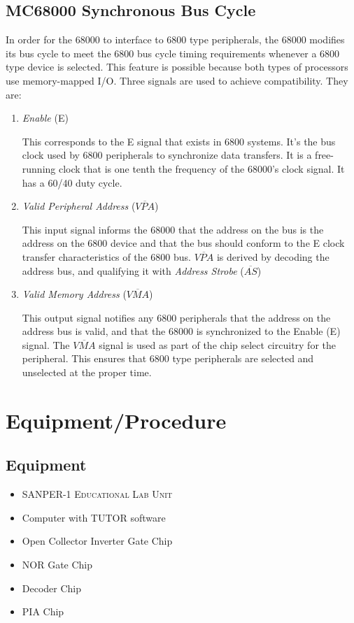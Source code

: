 \documentclass[12pt,Letter]{article}
\begin{document}
\subsection{MC68000 Synchronous Bus Cycle}
In order for the 68000 to interface to 6800 type peripherals, the 68000 modifies its bus cycle to meet the 6800 bus cycle timing requirements whenever a 6800 type device is selected. This feature is possible because both types of processors use memory-mapped I/O. Three signals are used to achieve compatibility. They are:
\begin{enumerate}
	\item \textit{Enable} (E)
	
	\vspace{.2cm}
	This corresponds to the E signal that exists in 6800 systems. It's the bus clock used by 6800 peripherals to synchronize data transfers. It is a free-running clock that is one tenth the frequency of the 68000's clock signal. It has a 60/40 duty cycle.
	
	\item \textit{Valid Peripheral Address} ($\overline{VPA}$)
	
	\vspace{.2cm}
	This input signal informs the 68000 that the address on the bus is the address on the 6800 device and that the bus should conform to the E clock transfer characteristics of the 6800 bus. $\overline{VPA}$ is derived by decoding the address bus, and qualifying it with \textit{Address Strobe} ($\overline{AS}$)
	
	\item \textit{Valid Memory Address} ($\overline{VMA}$)
	
	\vspace{.2cm}
	This output signal notifies any 6800 peripherals that the address on the address bus is valid, and that the 68000 is synchronized to the Enable (E) signal. The $\overline{VMA}$ signal is used as part of the chip select circuitry for the peripheral. This ensures that 6800 type peripherals are selected and unselected at the proper time.
\end{enumerate}
\section{Equipment/Procedure}
\subsection{Equipment}
\begin{itemize}
	\item \textsc{SANPER-1 Educational Lab Unit}
	\item Computer with TUTOR software
	\item Open Collector Inverter Gate Chip
	\item NOR Gate Chip
	\item Decoder Chip
	\item PIA Chip
\end{itemize}
\end{document}
